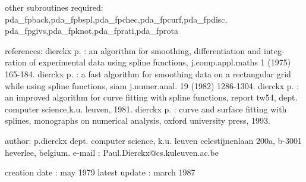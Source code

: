 \documentclass[11pt,twoside,nolof]{starlink}
\begin{document}
\begin{terminalv}
  other subroutines required:
    pda_fpback,pda_fpbspl,pda_fpchec,pda_fpcurf,pda_fpdisc,
    pda_fpgivs,pda_fpknot,pda_fprati,pda_fprota

  references:
   dierckx p. : an algorithm for smoothing, differentiation and integ-
                ration of experimental data using spline functions,
                j.comp.appl.maths 1 (1975) 165-184.
   dierckx p. : a fast algorithm for smoothing data on a rectangular
                grid while using spline functions, siam j.numer.anal.
                19 (1982) 1286-1304.
   dierckx p. : an improved algorithm for curve fitting with spline
                functions, report tw54, dept. computer science,k.u.
                leuven, 1981.
   dierckx p. : curve and surface fitting with splines, monographs on
                numerical analysis, oxford university press, 1993.

  author:
    p.dierckx
    dept. computer science, k.u. leuven
    celestijnenlaan 200a, b-3001 heverlee, belgium.
    e-mail : Paul.Dierckx@cs.kuleuven.ac.be

  creation date : may 1979
  latest update : march 1987
\end{terminalv}


\end{document}
